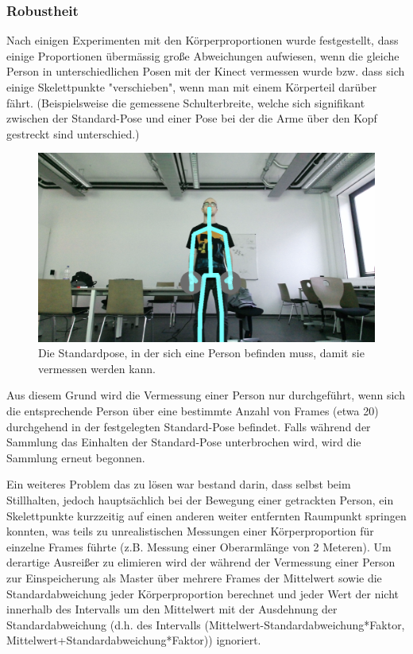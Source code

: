 \subsubsection{Robustheit}
Nach einigen Experimenten mit den Körperproportionen wurde festgestellt, dass einige Proportionen übermässig große Abweichungen aufwiesen, wenn die gleiche Person in unterschiedlichen Posen mit der Kinect vermessen wurde bzw. dass sich einige Skelettpunkte "verschieben", wenn man mit einem Körperteil darüber fährt. (Beispielsweise die gemessene Schulterbreite, welche sich signifikant zwischen der Standard-Pose und einer Pose bei der die Arme über den Kopf gestreckt sind unterschied.) 
\begin{figure}[h!]
		\centering
		\includegraphics[width=.8\textwidth]{pictures/standardpose_.png}
		\caption{Die Standardpose, in der sich eine Person befinden muss, damit sie vermessen werden kann.}\label{fig:standardp}
		\end{figure}
Aus diesem Grund wird die Vermessung einer Person nur durchgeführt, wenn sich die entsprechende Person über eine bestimmte Anzahl von Frames (etwa 20) durchgehend in der festgelegten Standard-Pose befindet. Falls während der Sammlung das Einhalten der Standard-Pose unterbrochen wird, wird die Sammlung erneut begonnen.\par
Ein weiteres Problem das zu lösen war bestand darin, dass selbst beim Stillhalten, jedoch hauptsächlich bei der Bewegung einer getrackten Person, ein Skelettpunkte kurzzeitig auf einen anderen weiter entfernten Raumpunkt springen konnten, was teils zu unrealistischen Messungen einer Körperproportion für einzelne Frames führte (z.B. Messung einer Oberarmlänge von 2 Meteren). Um derartige Ausreißer zu elimieren wird der während der Vermessung einer Person zur Einspeicherung als Master über mehrere Frames der Mittelwert sowie die Standardabweichung jeder Körperproportion berechnet und jeder Wert der nicht innerhalb des Intervalls um den Mittelwert mit der Ausdehnung der Standardabweichung (d.h. des Intervalls (Mittelwert-Standardabweichung*Faktor, Mittelwert+Standardabweichung*Faktor)) ignoriert. 
